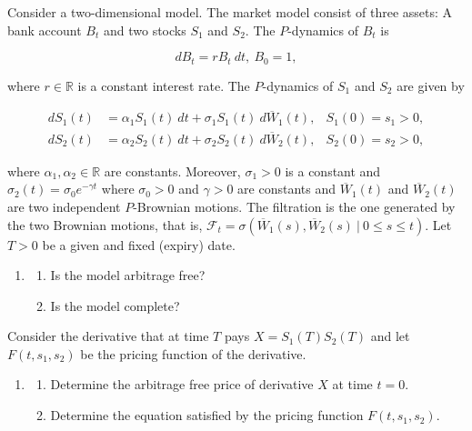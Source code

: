 \documentclass[
]{article}
\providecommand{\tightlist}{%
  \setlength{\itemsep}{0pt}\setlength{\parskip}{0pt}}
\begin{document}
Consider a two-dimensional model. The market model consist of three
assets: A bank account \(B_t\) and two stocks \(S_1\) and \(S_2\). The
\(P\)-dynamics of \(B_t\) is

\[
dB_t=rB_t\ dt,\ B_0=1,
\]

where \(r\in\mathbb{R}\) is a constant interest rate. The \(P\)-dynamics
of \(S_1\) and \(S_2\) are given by

\begin{align*}
dS_1(t)&=\alpha_1S_1(t)\ dt+\sigma_1S_1(t)\ d\overline{W}_1(t),&S_1(0)=s_1>0,\\
dS_2(t)&=\alpha_2S_2(t)\ dt+\sigma_2S_2(t)\ d\overline{W}_2(t),&S_2(0)=s_2>0,
\end{align*}

where \(\alpha_1,\alpha_2\in\mathbb{R}\) are constants. Moreover,
\(\sigma_1>0\) is a constant and \(\sigma_2(t)=\sigma_0e^{-\gamma t}\)
where \(\sigma_0>0\) and \(\gamma>0\) are constants and
\(\overline{W}_1(t)\) and \(\overline{W}_2(t)\) are two independent
\(P\)-Brownian motions. The filtration is the one generated by the two
Brownian motions, that is,
\(\mathcal{F}_t=\sigma(\overline{W}_1(s),\overline{W}_2(s)\ \vert\ 0\le s\le t)\).
Let \(T>0\) be a given and fixed (expiry) date.

\begin{enumerate}
\def\labelenumi{\alph{enumi}.}
\item
  \begin{enumerate}
  \def\labelenumii{\roman{enumii}.}
  \tightlist
  \item
    Is the model arbitrage free?
  \item
    Is the model complete?
  \end{enumerate}
\end{enumerate}

Consider the derivative that at time \(T\) pays \(X=S_1(T)S_2(T)\) and
let \(F(t,s_1,s_2)\) be the pricing function of the derivative.

\begin{enumerate}
\def\labelenumi{\alph{enumi}.}
\setcounter{enumi}{1}
\item
  \begin{enumerate}
  \def\labelenumii{\roman{enumii}.}
  \tightlist
  \item
    Determine the arbitrage free price of derivative \(X\) at time
    \(t=0\).
  \item
    Determine the equation satisfied by the pricing function
    \(F(t,s_1,s_2)\).
  \end{enumerate}
\end{enumerate}
\end{document}
